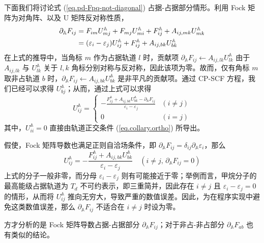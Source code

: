 下面我们将讨论式 (\ref{eq.pd-Fpq-not-diagonal}) 占据-占据部分情形。利用 Fock 矩阵为对角阵、以及 U 矩阵反对称性质，
\begin{align}
  \partial_\mathbb{A} F_{ij} &= F_{im} U_{mj}^\mathbb{A} + F_{mj} U_{mi}^\mathbb{A} + F_{ij}^\mathbb{A} + A_{ij, mk} U_{mk}^\mathbb{A} \notag\\
  &= (\varepsilon_i - \varepsilon_j) U_{ij}^\mathbb{A} + F_{ij}^\mathbb{A} + A_{ij, bk} U_{bk}^\mathbb{A}
\end{align}
在上式的推导中，当角标 $m$ 作为占据轨道 $l$ 时，贡献项 $\partial_\mathbb{A} F_{ij} \leftarrow A_{ij, lk} U_{lk}^\mathbb{A}$ 由于 $A_{ij, lk}$ 与 $U_{lk}^\mathbb{A}$ 关于 $l, k$ 角标分别对称与反对称，因此该项为零。故而，仅有角标 $m$ 取非占轨道 $b$ 时，$\partial_\mathbb{A} F_{ij} \leftarrow A_{ij, bk} U_{bk}^\mathbb{A}$ 是非平凡的贡献项。通过 CP-SCF 方程，我们已经可以求得 $U_{bj}^\mathbb{A}$；从而，通过上式可以求得
\begin{equation}
  U_{ij}^\mathbb{A} = 
  \begin{cases}
    \displaystyle
    - \frac{F_{ij}^\mathbb{A} + A_{ij, bk} U_{bk}^\mathbb{A} - \partial_\mathbb{A} F_{ij}}{\varepsilon_i - \varepsilon_j} & (i \neq j) \\
    0 & (i = j)
  \end{cases}
\end{equation}
其中，$U_{ii}^\mathbb{A} = 0$ 直接由轨道正交条件 (\ref{eq.collary.ortho}) 所导出。

假使，Fock 矩阵导数也满足正则自洽场条件，即 $\partial_\mathbb{A} F_{ij} = \delta_{ij} \partial_\mathbb{A} \varepsilon_i$，那么
\begin{equation}
  \label{eq.unstable-Uij}
  U_{ij}^\mathbb{A} = - \frac{F_{ij}^\mathbb{A} + A_{ij, bk} U_{bk}^\mathbb{A}}{\varepsilon_i - \varepsilon_j} \quad \left( i \neq j, \, \partial_\mathbb{A} F_{ij} = 0 \right)
\end{equation}
上式的分子一般非零，而分母 $\varepsilon_i - \varepsilon_j$ 则有可能接近于零；举例而言，甲烷分子的最高能级占据轨道为 $T_d$ 不可约表示，即三重简并，因此存在 $i \neq j$ 且 $\varepsilon_i - \varepsilon_j = 0$ 的情形，从而将 $U_{ij}^\mathbb{A}$ 推向无穷大，导致严重的数值误差。因此，为在程序实现中避免这类数值误差，那么 $\partial_\mathbb{A} F_{ij}$ 不适合在 $i \neq j$ 时设为零。

方才分析的是 Fock 矩阵导数占据-占据部分 $\partial_\mathbb{A} F_{ij}$；对于非占-非占部分 $\partial_\mathbb{A} F_{ab}$ 也有类似的结论。

